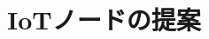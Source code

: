 \documentclass[submit,techrep,noauthor]{ipsj}
\def\|{\verb|}
\begin{document}
%  本文中で参考文献を参照する場合には\|\cite|を使用する．




\section{IoTノードの提案}


\end{document}
